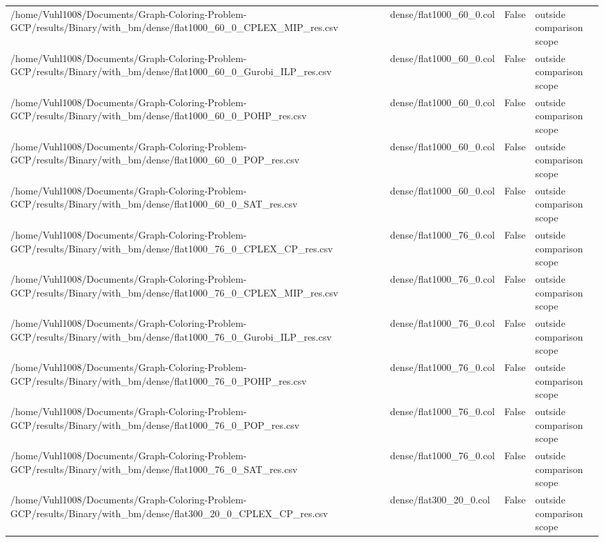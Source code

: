 \begin{table}[htbp]
\begin{tabular}{llll}
/home/Vuhl1008/Documents/Graph-Coloring-Problem-GCP/results/Binary/with\_bm/dense/flat1000\_60\_0\_CPLEX\_MIP\_res.csv & dense/flat1000\_60\_0.col & False & outside comparison scope \\
/home/Vuhl1008/Documents/Graph-Coloring-Problem-GCP/results/Binary/with\_bm/dense/flat1000\_60\_0\_Gurobi\_ILP\_res.csv & dense/flat1000\_60\_0.col & False & outside comparison scope \\
/home/Vuhl1008/Documents/Graph-Coloring-Problem-GCP/results/Binary/with\_bm/dense/flat1000\_60\_0\_POHP\_res.csv & dense/flat1000\_60\_0.col & False & outside comparison scope \\
/home/Vuhl1008/Documents/Graph-Coloring-Problem-GCP/results/Binary/with\_bm/dense/flat1000\_60\_0\_POP\_res.csv & dense/flat1000\_60\_0.col & False & outside comparison scope \\
/home/Vuhl1008/Documents/Graph-Coloring-Problem-GCP/results/Binary/with\_bm/dense/flat1000\_60\_0\_SAT\_res.csv & dense/flat1000\_60\_0.col & False & outside comparison scope \\
/home/Vuhl1008/Documents/Graph-Coloring-Problem-GCP/results/Binary/with\_bm/dense/flat1000\_76\_0\_CPLEX\_CP\_res.csv & dense/flat1000\_76\_0.col & False & outside comparison scope \\
/home/Vuhl1008/Documents/Graph-Coloring-Problem-GCP/results/Binary/with\_bm/dense/flat1000\_76\_0\_CPLEX\_MIP\_res.csv & dense/flat1000\_76\_0.col & False & outside comparison scope \\
/home/Vuhl1008/Documents/Graph-Coloring-Problem-GCP/results/Binary/with\_bm/dense/flat1000\_76\_0\_Gurobi\_ILP\_res.csv & dense/flat1000\_76\_0.col & False & outside comparison scope \\
/home/Vuhl1008/Documents/Graph-Coloring-Problem-GCP/results/Binary/with\_bm/dense/flat1000\_76\_0\_POHP\_res.csv & dense/flat1000\_76\_0.col & False & outside comparison scope \\
/home/Vuhl1008/Documents/Graph-Coloring-Problem-GCP/results/Binary/with\_bm/dense/flat1000\_76\_0\_POP\_res.csv & dense/flat1000\_76\_0.col & False & outside comparison scope \\
/home/Vuhl1008/Documents/Graph-Coloring-Problem-GCP/results/Binary/with\_bm/dense/flat1000\_76\_0\_SAT\_res.csv & dense/flat1000\_76\_0.col & False & outside comparison scope \\
/home/Vuhl1008/Documents/Graph-Coloring-Problem-GCP/results/Binary/with\_bm/dense/flat300\_20\_0\_CPLEX\_CP\_res.csv & dense/flat300\_20\_0.col & False & outside comparison scope \\

\end{tabular}
\end{table}
